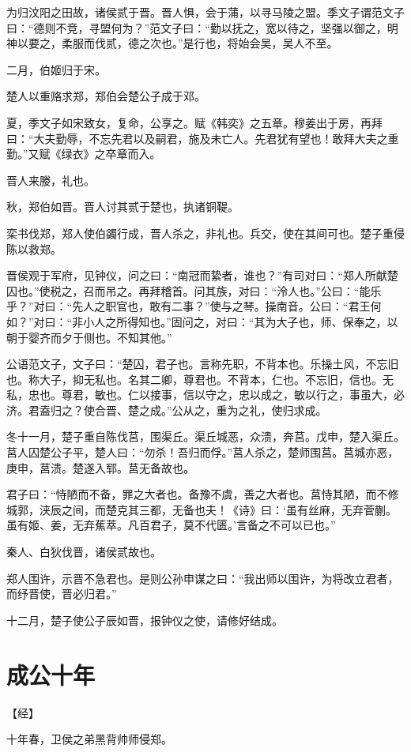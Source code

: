 \documentclass[a4paper,12pt,UTF8,twoside]{ctexbook}
\begin{document}
为归汶阳之田故，诸侯贰于晋。晋人惧，会于蒲，以寻马陵之盟。季文子谓范文子曰：“德则不竞，寻盟何为？”范文子曰：“勤以抚之，宽以待之，坚强以御之，明神以要之，柔服而伐贰，德之次也。”是行也，将始会吴，吴人不至。

二月，伯姬归于宋。

楚人以重赂求郑，郑伯会楚公子成于邓。

夏，季文子如宋致女，复命，公享之。赋《韩奕》之五章。穆姜出于房，再拜曰：“大夫勤辱，不忘先君以及嗣君，施及未亡人。先君犹有望也！敢拜大夫之重勤。”又赋《绿衣》之卒章而入。

晋人来媵，礼也。

秋，郑伯如晋。晋人讨其贰于楚也，执诸铜鞮。

栾书伐郑，郑人使伯蠲行成，晋人杀之，非礼也。兵交，使在其间可也。楚子重侵陈以救郑。

晋侯观于军府，见钟仪，问之曰：“南冠而絷者，谁也？”有司对曰：“郑人所献楚囚也。”使税之，召而吊之。再拜稽首。问其族，对曰：“泠人也。”公曰：“能乐乎？”对曰：“先人之职官也，敢有二事？”使与之琴。操南音。公曰：“君王何如？”对曰：“非小人之所得知也。”固问之，对曰：“其为大子也，师、保奉之，以朝于婴齐而夕于侧也。不知其他。”

公语范文子，文子曰：“楚囚，君子也。言称先职，不背本也。乐操土风，不忘旧也。称大子，抑无私也。名其二卿，尊君也。不背本，仁也。不忘旧，信也。无私，忠也。尊君，敏也。仁以接事，信以守之，忠以成之，敏以行之，事虽大，必济。君盍归之？使合晋、楚之成。”公从之，重为之礼，使归求成。

冬十一月，楚子重自陈伐莒，围渠丘。渠丘城恶，众溃，奔莒。戊申，楚入渠丘。莒人囚楚公子平，楚人曰：“勿杀！吾归而俘。”莒人杀之，楚师围莒。莒城亦恶，庚申，莒溃。楚遂入郓。莒无备故也。

君子曰：“恃陋而不备，罪之大者也。备豫不虞，善之大者也。莒恃其陋，而不修城郭，浃辰之间，而楚克其三都，无备也夫！《诗》曰：‘虽有丝麻，无弃菅蒯。虽有姬、姜，无弃蕉萃。凡百君子，莫不代匮。’言备之不可以已也。”

秦人、白狄伐晋，诸侯贰故也。

郑人围许，示晋不急君也。是则公孙申谋之曰：“我出师以围许，为将改立君者，而纾晋使，晋必归君。”

十二月，楚子使公子辰如晋，报钟仪之使，请修好结成。

\chapter{成公十年}


【经】

十年春，卫侯之弟黑背帅师侵郑。
\end{document}
